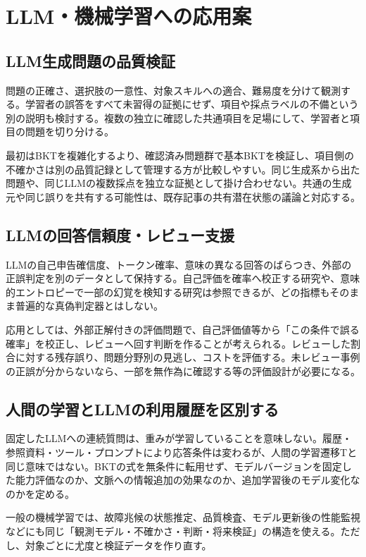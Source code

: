 \documentclass[11pt,a4paper]{article}
\numberwithin{equation}{section}
\begin{document}
\section{LLM・機械学習への応用案}

\subsection{LLM生成問題の品質検証}

問題の正確さ、選択肢の一意性、対象スキルへの適合、難易度を分けて観測する。学習者の誤答をすべて未習得の証拠にせず、項目や採点ラベルの不備という別の説明も検討する。複数の独立に確認した共通項目を足場にして、学習者と項目の問題を切り分ける。

最初はBKTを複雑化するより、確認済み問題群で基本BKTを検証し、項目側の不確かさは別の品質記録として管理する方が比較しやすい。同じ生成系から出た問題や、同じLLMの複数採点を独立な証拠として掛け合わせない。共通の生成元や同じ誤りを共有する可能性は、既存記事の共有潜在状態の議論と対応する。

\subsection{LLMの回答信頼度・レビュー支援}

LLMの自己申告確信度、トークン確率、意味の異なる回答のばらつき、外部の正誤判定を別のデータとして保持する。自己評価を確率へ校正する研究\cite{ext7}や、意味的エントロピーで一部の幻覚を検知する研究\cite{ext8}は参照できるが、どの指標もそのまま普遍的な真偽判定器とはしない。

応用としては、外部正解付きの評価問題で、自己評価値等から「この条件で誤る確率」を校正し、レビューへ回す判断を作ることが考えられる。レビューした割合に対する残存誤り、問題分野別の見逃し、コストを評価する。未レビュー事例の正誤が分からないなら、一部を無作為に確認する等の評価設計が必要になる。

\subsection{人間の学習とLLMの利用履歴を区別する}

固定したLLMへの連続質問は、重みが学習していることを意味しない。履歴・参照資料・ツール・プロンプトにより応答条件は変わるが、人間の学習遷移Tと同じ意味ではない。BKTの式を無条件に転用せず、モデルバージョンを固定した能力評価なのか、文脈への情報追加の効果なのか、追加学習後のモデル変化なのかを定める。

一般の機械学習では、故障兆候の状態推定、品質検査、モデル更新後の性能監視などにも同じ「観測モデル・不確かさ・判断・将来検証」の構造を使える。ただし、対象ごとに尤度と検証データを作り直す。
\end{document}
